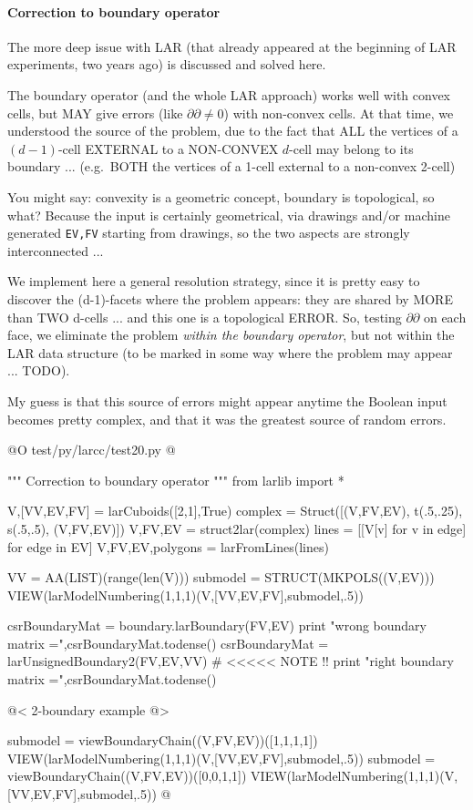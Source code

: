 \documentclass[11pt,oneside]{article}    %
\begin{document}
\paragraph{Correction to boundary operator}
The more deep issue with LAR (that already appeared at the beginning of LAR experiments, two years ago) is discussed and solved here.

The boundary operator (and the whole LAR approach) works well with convex cells, but MAY give errors (like $\partial\partial \not= 0$) with non-convex cells. At that time, we understood the source of the problem, due to the fact that ALL the vertices of a $(d-1)$-cell  EXTERNAL to a NON-CONVEX $d$-cell may belong to its boundary ... (e.g.~BOTH the vertices of a 1-cell external to a non-convex 2-cell)

You might say: convexity is a geometric concept, boundary is topological, so what? 
Because the input is certainly geometrical, via drawings and/or machine generated \texttt{EV,FV} starting from drawings, so the two aspects are strongly interconnected ... 

We implement here a general resolution strategy, since it is pretty  easy to discover the (d-1)-facets where the problem appears:  they are shared by MORE than TWO d-cells ... and this one is a topological ERROR. So, testing $\partial\partial$ on each face, we eliminate the problem \emph{within the boundary operator}, but not within the LAR data structure (to be marked in some way where the problem may appear ... TODO).

My guess is that this source of errors might appear anytime the Boolean input becomes pretty complex, and that it was the greatest source of random errors. 

@O test/py/larcc/test20.py
@{""" Correction to boundary operator """
from larlib import *

V,[VV,EV,FV] = larCuboids([2,1],True)
complex = Struct([(V,FV,EV), t(.5,.25), s(.5,.5), (V,FV,EV)])
V,FV,EV = struct2lar(complex)
lines = [[V[v] for v in edge] for edge in EV]
V,FV,EV,polygons = larFromLines(lines)

VV = AA(LIST)(range(len(V)))
submodel = STRUCT(MKPOLS((V,EV)))
VIEW(larModelNumbering(1,1,1)(V,[VV,EV,FV],submodel,.5)) 

csrBoundaryMat = boundary.larBoundary(FV,EV)
print "wrong boundary matrix =",csrBoundaryMat.todense()
csrBoundaryMat = larUnsignedBoundary2(FV,EV,VV)  # <<<<< NOTE !!
print "right boundary matrix =",csrBoundaryMat.todense()

@< 2-boundary example @>

submodel = viewBoundaryChain((V,FV,EV))([1,1,1,1])
VIEW(larModelNumbering(1,1,1)(V,[VV,EV,FV],submodel,.5)) 
submodel = viewBoundaryChain((V,FV,EV))([0,0,1,1])
VIEW(larModelNumbering(1,1,1)(V,[VV,EV,FV],submodel,.5)) 
@}
\end{document}
